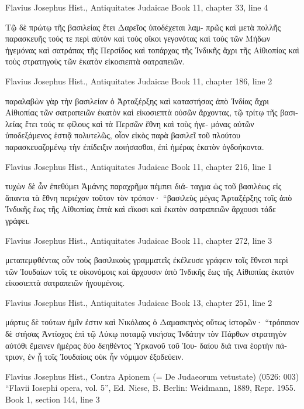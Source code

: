 \documentclass[12pt,letterpaper,twoside,final]{memoir}
\begin{document}
\begin{greek}
Flavius Josephus Hist., Antiquitates Judaicae 
Book 11, chapter 33, line 4

Τῷ δὲ πρώτῳ τῆς βασιλείας ἔτει Δαρεῖος ὑποδέχεται λαμ-
πρῶς καὶ μετὰ πολλῆς παρασκευῆς τούς τε περὶ αὐτὸν καὶ τοὺς 
οἴκοι γεγονότας καὶ τοὺς τῶν Μήδων ἡγεμόνας καὶ σατράπας τῆς 
Περσίδος καὶ τοπάρχας τῆς Ἰνδικῆς ἄχρι τῆς Αἰθιοπίας καὶ τοὺς 
στρατηγοὺς τῶν ἑκατὸν εἰκοσιεπτὰ σατραπειῶν. 



Flavius Josephus Hist., Antiquitates Judaicae 
Book 11, chapter 186, line 2

                                          παραλαβὼν γὰρ τὴν βασιλείαν 
ὁ Ἀρταξέρξης καὶ καταστήσας ἀπὸ Ἰνδίας ἄχρι Αἰθιοπίας τῶν 
σατραπειῶν ἑκατὸν καὶ εἰκοσιεπτὰ οὐσῶν ἄρχοντας, τῷ τρίτῳ τῆς 
βασιλείας ἔτει τούς τε φίλους καὶ τὰ Περσῶν ἔθνη καὶ τοὺς ἡγε-
μόνας αὐτῶν ὑποδεξάμενος ἑστιᾷ πολυτελῶς, οἷον εἰκὸς παρὰ 
βασιλεῖ τοῦ πλούτου παρασκευαζομένῳ τὴν ἐπίδειξιν ποιήσασθαι, 
ἐπὶ ἡμέρας ἑκατὸν ὀγδοήκοντα. 



Flavius Josephus Hist., Antiquitates Judaicae 
Book 11, chapter 216, line 1

       τυχὼν δὲ ὧν ἐπεθύμει Ἀμάνης παραχρῆμα πέμπει διά-
ταγμα ὡς τοῦ βασιλέως εἰς ἅπαντα τὰ ἔθνη περιέχον τοῦτον τὸν 
τρόπον· “βασιλεὺς μέγας Ἀρταξέρξης τοῖς ἀπὸ Ἰνδικῆς ἕως τῆς 
Αἰθιοπίας ἑπτὰ καὶ εἴκοσι καὶ ἑκατὸν σατραπειῶν ἄρχουσι τάδε 
γράφει. 



Flavius Josephus Hist., Antiquitates Judaicae 
Book 11, chapter 272, line 3

                            μεταπεμφθέντας οὖν τοὺς βασιλικοὺς 
γραμματεῖς ἐκέλευσε γράφειν τοῖς ἔθνεσι περὶ τῶν Ἰουδαίων τοῖς 
τε οἰκονόμοις καὶ ἄρχουσιν ἀπὸ Ἰνδικῆς ἕως τῆς Αἰθιοπίας ἑκατὸν 
εἰκοσιεπτὰ σατραπειῶν ἡγουμένοις. 



Flavius Josephus Hist., Antiquitates Judaicae 
Book 13, chapter 251, line 2

                                     μάρτυς δὲ τούτων ἡμῖν ἐστιν 
καὶ Νικόλαος ὁ Δαμασκηνὸς οὕτως ἱστορῶν· “τρόπαιον δὲ στήσας 
Ἀντίοχος ἐπὶ τῷ Λύκῳ ποταμῷ νικήσας Ἰνδάτην τὸν Πάρθων 
στρατηγὸν αὐτόθι ἔμεινεν ἡμέρας δύο δεηθέντος Ὑρκανοῦ τοῦ Ἰου-
δαίου διά τινα ἑορτὴν πάτριον, ἐν ᾗ τοῖς Ἰουδαίοις οὐκ ἦν νόμιμον 
ἐξοδεύειν. 



Flavius Josephus Hist., Contra Apionem (= De Judaeorum vetustate) (0526: 003)
“Flavii Iosephi opera, vol. 5”, Ed. Niese, B.
Berlin: Weidmann, 1889, Repr. 1955.
Book 1, section 144, line 3


\end{greek}
\end{document}
